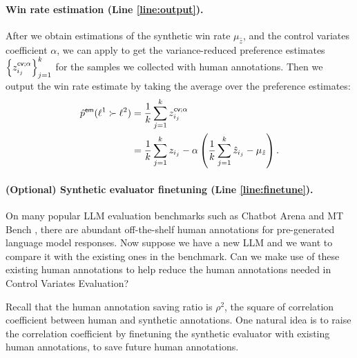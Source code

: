 \paragraph{Win rate estimation (Line \ref{line:output}).}
After we obtain estimations of the synthetic win rate $\mu_{\hat z}$, and the control variates coefficient $\alpha$, we can apply  to get the variance-reduced preference estimates $\left\{z^{\mathsf{cv}; \alpha}_{i_j}\right\}_{j=1}^k$ for the samples we collected with human annotations. Then we output the win rate estimate by taking the average over the preference estimates:
\begin{align}
    \hat p^{\mathsf{em}}(\ell^1\succ \ell^2) & = \frac{1}{k} \sum_{j=1}^k z^{\mathsf{cv}; \alpha}_{i_j} \notag \\
    & = \frac{1}{k} \sum_{j=1}^k z_{i_j} - \alpha\left(\frac{1}{k}\sum_{j=1}^k \hat z_{i_j} - \mu_{\hat z} \right).
    \label{eq:output}
\end{align}

\paragraph{(Optional) Synthetic evaluator finetuning (Line \ref{line:finetune}).} 
On many popular LLM evaluation benchmarks such as Chatbot Arena and MT Bench \citep{zheng2023judging}, there are abundant off-the-shelf human annotations for pre-generated language model responses. Now suppose we have a new LLM and we want to compare it with the existing ones in the benchmark. Can we make use of these existing human annotations to help reduce the human annotations needed in Control Variates Evaluation? 

Recall that the human annotation saving ratio is $\rho^2$, the square of correlation coefficient between human and synthetic annotations. One natural idea is to raise the correlation coefficient by finetuning the synthetic evaluator with existing human annotations, to save future human annotations. 

